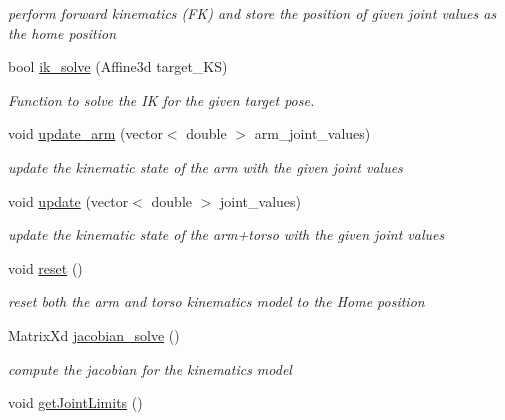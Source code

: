 \begin{DoxyCompactItemize}
\begin{DoxyCompactList}\small\item\em perform forward kinematics (FK) and store the position of given joint values as the home position \end{DoxyCompactList}\item 
bool \hyperlink{classMOVEIT__IK_a790708eba19044f34e00c2e78998ff09}{ik\+\_\+solve} (Affine3d target\+\_\+\+KS)
\begin{DoxyCompactList}\small\item\em Function to solve the IK for the given target pose. \end{DoxyCompactList}\item 
void \hyperlink{classMOVEIT__IK_a0bdc6f6a1cefeaad6651495c463dd6ed}{update\+\_\+arm} (vector$<$ double $>$ arm\+\_\+joint\+\_\+values)
\begin{DoxyCompactList}\small\item\em update the kinematic state of the arm with the given joint values \end{DoxyCompactList}\item 
void \hyperlink{classMOVEIT__IK_a1399d0e0159b8ed7af938116fee6dc93}{update} (vector$<$ double $>$ joint\+\_\+values)
\begin{DoxyCompactList}\small\item\em update the kinematic state of the arm+torso with the given joint values \end{DoxyCompactList}\item 
\mbox{\label{classMOVEIT__IK_af059baeee7ac1bdfc109e775f710380a}} 
void \hyperlink{classMOVEIT__IK_af059baeee7ac1bdfc109e775f710380a}{reset} ()
\begin{DoxyCompactList}\small\item\em reset both the arm and torso kinematics model to the \textquotesingle{}Home\textquotesingle{} position \end{DoxyCompactList}\item 
Matrix\+Xd \hyperlink{classMOVEIT__IK_a0086f93313ee7036d8897d6156b1395b}{jacobian\+\_\+solve} ()
\begin{DoxyCompactList}\small\item\em compute the jacobian for the kinematics model \end{DoxyCompactList}\item 
\mbox{\label{classMOVEIT__IK_a1cd828f223bc110073993c8df6b9a561}} 
void \hyperlink{classMOVEIT__IK_a1cd828f223bc110073993c8df6b9a561}{get\+Joint\+Limits} ()

\end{DoxyCompactItemize}
